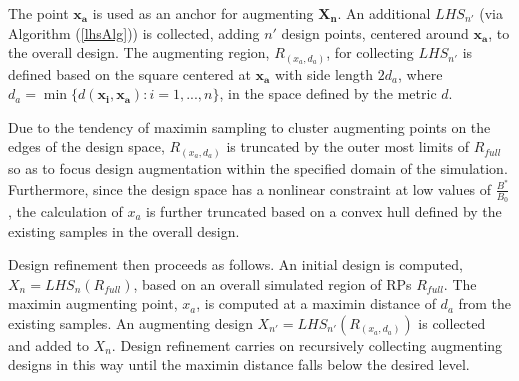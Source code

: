 %
The point $\bm{x_a}$ is used as an anchor for augmenting $\bm{X_n}$. %
An additional $LHS_{n'}$ (via Algorithm (\ref{lhsAlg})) is collected, adding 
$n'$ design points, centered around $\bm{x_a}$, to the overall design. %
The augmenting region, $R_{(x_a, d_a)}$, for collecting $LHS_{n'}$ is defined 
based on the square centered at $\bm{x_a}$ with side length $2d_a$, where 
\mbox{$d_a = \min\{ d(\bm{x_i}, \bm{x_a}): i=1,...,n \}$}, in the space defined 
by the metric $d$.
%

%
Due to the tendency of maximin sampling to cluster augmenting points on the edges 
of the design space, $R_{(x_a, d_a)}$ is truncated by the outer most limits of 
$R_{full}$ so as to focus design augmentation within the specified domain of the 
simulation. Furthermore, since the design space has a nonlinear constraint at low 
values of $\frac{B^*}{B_0}$, the calculation of $x_a$ is further truncated 
based on a convex hull defined by the existing samples in the overall design.

%

%
Design refinement then proceeds as follows. An initial design is computed, $X_{n} = LHS_{n}(R_{full})$, %
based on an overall simulated region of RPs $R_{full}$. The maximin augmenting 
point, $x_a$, is computed at a maximin distance of $d_a$ from the existing samples. 
An augmenting design $X_{n'} = LHS_{n'}(R_{(x_a, d_a)})$ is collected and 
added to $X_n$. Design refinement carries on recursively collecting augmenting 
designs in this way until the maximin distance falls below the desired level.
 




